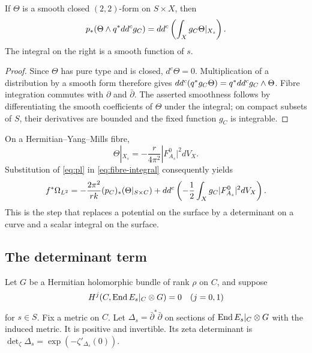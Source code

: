 \begin{lemma}\label{lem:transgression}
If $\Theta$ is a smooth closed $(2,2)$-form on $S\times X$, then
\begin{equation}\label{eq:transgression}
 p_*(\Theta\wedge q^*dd^c g_C)
 =dd^c\left(\int_Xg_C\Theta|_{X_s}\right).
\end{equation}
The integral on the right is a smooth function of $s$.
\end{lemma}
\begin{proof}
Since $\Theta$ has pure type and is closed, $d^c\Theta=0$.
Multiplication of a distribution by a smooth form therefore gives
$dd^c(q^*g_C\Theta)=q^*dd^c g_C\wedge\Theta$.
Fibre integration commutes with $\partial$ and $\bar\partial$.
The asserted smoothness follows by differentiating the smooth coefficients
of $\Theta$ under the integral; on compact subsets of $S$, their derivatives
are bounded and the fixed function $g_C$ is integrable.
\end{proof}

On a Hermitian--Yang--Mills fibre,
\[
 \Theta|_{X_s}=-\frac{r}{4\pi^2}|F_{A_s}^0|^2dV_X.
\]
Substitution of \eqref{eq:pl} in \eqref{eq:fibre-integral} consequently yields
\begin{equation}\label{eq:curve-transgression}
 f^*\Omega_{L^2}=-\frac{2\pi^2}{rk}(p_C)_*(\Theta|_{S\times C})
       +dd^c\left(-\frac12\int_Xg_C|F_{A_s}^0|^2dV_X\right).
\end{equation}
This is the step that replaces a potential on the surface by a determinant
on a curve and a scalar integral on the surface.

\subsection{The determinant term}
Let $G$ be a Hermitian holomorphic bundle of rank $\rho$ on $C$, and suppose
\begin{equation}\label{eq:acyclic}
 H^j(C,\operatorname{End} E_s|_C\otimes G)=0\quad(j=0,1)
\end{equation}
for $s\in S$. Fix a metric on $C$. Let $\Delta_s=\bar\partial^*\bar\partial$
on sections of $\operatorname{End} E_s|_C\otimes G$ with the induced metric.
It is positive and invertible. Its zeta determinant is
$\det_\zeta\Delta_s=\exp(-\zeta'_{\Delta_s}(0))$.

